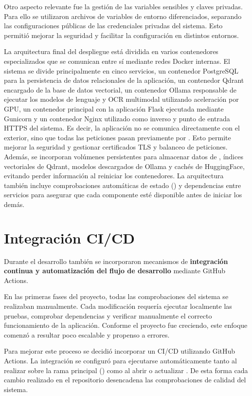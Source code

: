 Otro aspecto relevante fue la gestión de las variables sensibles y claves privadas. Para ello se utilizaron archivos de variables de entorno diferenciados, separando las configuraciones públicas de las credenciales privadas del sistema. Esto permitió mejorar la seguridad y facilitar la configuración en distintos entornos.

La arquitectura final del despliegue está dividida en varios contenedores especializados que se comunican entre sí mediante redes Docker internas. El sistema se divide principalmente en cinco servicios, un contenedor PostgreSQL para la persistencia de datos relacionales de la aplicación, un contenedor Qdrant encargado de la base de datos vectorial, un contenedor Ollama responsable de ejecutar los modelos de lenguaje y OCR multimodal utilizando aceleración por GPU, un contenedor principal con la aplicación Flask ejecutada mediante Gunicorn y un contenedor Nginx utilizado como  inverso y punto de entrada HTTPS del sistema. Es decir, la aplicación  no se comunica directamente con el exterior, sino que todas las peticiones pasan previamente por . Esto permite mejorar la seguridad y gestionar certificados TLS y balanceo de peticiones. Además, se incorporan volúmenes persistentes para almacenar datos de , índices vectoriales de Qdrant, modelos descargados de Ollama y cachés de HuggingFace, evitando perder información al reiniciar los contenedores. La arquitectura también incluye comprobaciones automáticas de estado () y dependencias entre servicios para asegurar que cada componente esté disponible antes de iniciar los demás.

\section{Integración CI/CD}

Durante el desarrollo también se incorporaron mecanismos de \textbf{integración continua y automatización del flujo de desarrollo} mediante GitHub Actions.

En las primeras fases del proyecto, todas las comprobaciones del sistema se realizaban manualmente. Cada modificación requería ejecutar localmente las pruebas, comprobar dependencias y verificar manualmente el correcto funcionamiento de la aplicación. Conforme el proyecto fue creciendo, este enfoque comenzó a resultar poco escalable y propenso a errores.

Para mejorar este proceso se decidió incorporar un  CI/CD utilizando GitHub Actions. La integración se configuró para ejecutarse automáticamente tanto al realizar  sobre la rama principal () como al abrir o actualizar . De esta forma cada cambio realizado en el repositorio desencadena las comprobaciones de calidad del sistema. 

